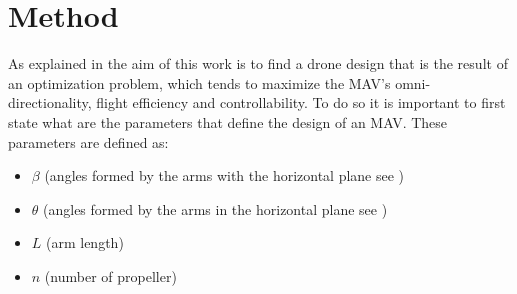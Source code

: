 \chapter{Method}
\label{sec:method}
As explained in  the aim of this work is to find a drone
design that is the result of an optimization problem, which tends to maximize the
MAV's omni-directionality, flight efficiency and controllability. To do so it is
important to first state what are the parameters that define the design of an MAV.
These parameters are defined as:

\begin{itemize}
\item $\beta$  (angles formed by the arms with the horizontal plane see )
\item $\theta$ (angles formed by the arms in the horizontal plane see )
\item $L$ (arm length)
\item $n$ (number of propeller)
\end{itemize}

